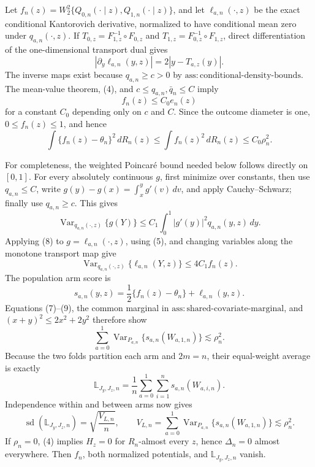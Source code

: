Let \(f_n(z)=W_2^2\{Q_{0,n}(\cdot\mid z),Q_{1,n}(\cdot\mid z)\}\), and let \(\ell_{a,n}(\cdot,z)\) be the exact conditional Kantorovich derivative, normalized to have conditional mean zero under \(q_{a,n}(\cdot,z)\).  If \(T_{0,z}=F_{1,z}^{-1}\circ F_{0,z}\) and \(T_{1,z}=F_{0,z}^{-1}\circ F_{1,z}\), direct differentiation of the one-dimensional transport dual gives
\[
|\partial_y\ell_{a,n}(y,z)|=2|y-T_{a,z}(y)|.                                    \tag{5}
\]
The inverse maps exist because \(q_{a,n}\ge c>0\) by \(\mathrm{ass{:}conditional\text{-}density\text{-}bounds}\).  The mean-value theorem, (4), and \(c\le q_{a,n},\bar q_n\le C\) imply
\[
f_n(z)\le C_0 e_n(z)                                                            \tag{6}
\]
for a constant \(C_0\) depending only on \(c\) and \(C\).  Since the outcome diameter is one, \(0\le f_n(z)\le1\), and hence
\[
\int\{f_n(z)-\theta_n\}^2\,dR_n(z)
\le\int f_n(z)^2\,dR_n(z)
\le C_0\rho_n^2.                                                               \tag{7}
\]

For completeness, the weighted Poincar\'e bound needed below follows directly on \([0,1]\).  For every absolutely continuous \(g\), first minimize over constants, then use \(q_{a,n}\le C\), write \(g(y)-g(x)=\int_x^yg'(v)\,dv\), and apply Cauchy--Schwarz; finally use \(q_{a,n}\ge c\).  This gives
\[
\operatorname{Var}_{q_{a,n}(\cdot,z)}\{g(Y)\}
\le C_1\int_0^1|g'(y)|^2q_{a,n}(y,z)\,dy.                                      \tag{8}
\]
Applying (8) to \(g=\ell_{a,n}(\cdot,z)\), using (5), and changing variables along the monotone transport map give
\[
\operatorname{Var}_{q_{a,n}(\cdot,z)}\{\ell_{a,n}(Y,z)\}
\le4C_1 f_n(z).                                                                 \tag{9}
\]
The population arm score is
\[
s_{a,n}(y,z)=\frac12\{f_n(z)-\theta_n\}+\ell_{a,n}(y,z).
\]
Equations (7)--(9), the common marginal in \(\mathrm{ass{:}shared\text{-}covariate\text{-}marginal}\), and \((x+y)^2\le2x^2+2y^2\) therefore show
\[
\sum_{a=0}^1\operatorname{Var}_{P_{a,n}}\{s_{a,n}(W_{a,1,n})\}
\lesssim\rho_n^2.                                                              \tag{10}
\]
Because the two folds partition each arm and \(2m=n\), their equal-weight average is exactly
\[
\mathbb L_{J_y,J_z,n}=\frac1n\sum_{a=0}^1\sum_{i=1}^ns_{a,n}(W_{a,i,n}).
\]
Independence within and between arms now gives
\[
\operatorname{sd}(\mathbb L_{J_y,J_z,n})
=\sqrt{\frac{V_{L,n}}n},
\qquad
V_{L,n}=\sum_{a=0}^1\operatorname{Var}_{P_{a,n}}\{s_{a,n}(W_{a,1,n})\}
\lesssim\rho_n^2.                                                              \tag{11}
\]
If \(\rho_n=0\), (4) implies \(H_z=0\) for \(R_n\)-almost every \(z\), hence \(\Delta_n=0\) almost everywhere.  Then \(f_n\), both normalized potentials, and \(\mathbb L_{J_y,J_z,n}\) vanish.

